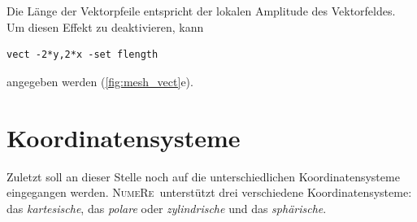 \documentclass[DIV=14,headsepline,footsepline]{scrbook}
\newcommand{\NR}{\textsc{Nu\-me\-Re}}
\begin{document}
				Die Länge der Vektorpfeile entspricht der lokalen Amplitude des Vektorfeldes. Um diesen Effekt zu deaktivieren, kann 
				\begin{lstlisting}
vect -2*y,2*x -set flength
				\end{lstlisting}
				angegeben werden (\autoref{fig:mesh_vect}e).
				
			\section{Koordinatensysteme}
				Zuletzt soll an dieser Stelle noch auf die unterschiedlichen Koordinatensysteme eingegangen werden. \NR\ unterstützt drei verschiedene Koordinatensysteme: das \emph{kartesische}, das \emph{polare} oder \emph{zylindrische} und das \emph{sphärische}.
				\begin{figure}[htb]%
					\centering
					\\

\end{figure}
\end{document}
